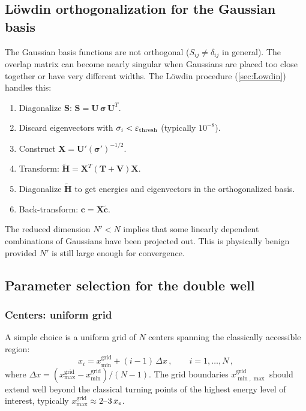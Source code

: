 \subsection{L\"owdin orthogonalization for the Gaussian basis}\label{sec:Gauss_Lowdin}

The Gaussian basis functions are not orthogonal ($S_{ij} \neq \delta_{ij}$ in general).
The overlap matrix can become nearly singular when Gaussians are placed too close together
or have very different widths. The L\"owdin procedure (\cref{sec:Lowdin}) handles this:

\begin{enumerate}
  \item Diagonalize $\mathbf{S}$: $\mathbf{S} = \mathbf{U}\,\bm{\sigma}\,\mathbf{U}^T$.
  \item Discard eigenvectors with $\sigma_i < \varepsilon_{\text{thresh}}$ (typically $10^{-8}$).
  \item Construct $\mathbf{X} = \mathbf{U}'(\bm{\sigma}')^{-1/2}$.
  \item Transform: $\tilde{\mathbf{H}} = \mathbf{X}^T(\mathbf{T}+\mathbf{V})\mathbf{X}$.
  \item Diagonalize $\tilde{\mathbf{H}}$ to get energies and eigenvectors in the orthogonalized basis.
  \item Back-transform: $\mathbf{c} = \mathbf{X}\tilde{\mathbf{c}}$.
\end{enumerate}

The reduced dimension $N' < N$ implies that some linearly dependent combinations of
Gaussians have been projected out. This is physically benign provided $N'$ is still
large enough for convergence.

\subsection{Parameter selection for the double well}\label{sec:Gauss_params}

\subsubsection{Centers: uniform grid}

A simple choice is a uniform grid of $N$ centers spanning the classically accessible region:
\begin{equation}
  x_i = x_{\min}^{\text{grid}} + (i-1)\,\Delta x\,,\qquad i = 1, \ldots, N\,,
\end{equation}
where $\Delta x = (x_{\max}^{\text{grid}} - x_{\min}^{\text{grid}})/(N-1)$.
The grid boundaries $x_{\min,\max}^{\text{grid}}$ should extend well beyond the
classical turning points of the highest energy level of interest, typically
$x_{\max}^{\text{grid}} \approx 2$--$3\,x_e$.

